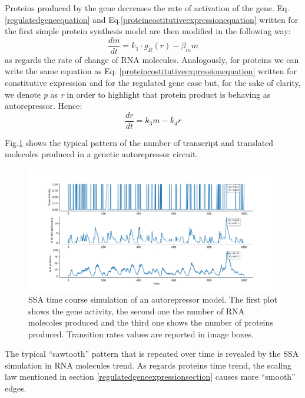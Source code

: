 \documentclass[12pt,a4paper]{report}
\begin{document}
Proteins produced by the gene decreases the rate of activation of the gene. Eq.\ref{regulatedgeneequation} and Eq.\ref{proteincostitutiveexpressionequation} written for the first simple protein synthesis model are then modified in the following way:
\begin{equation}
 \frac{dm}{dt} = k_{1} \cdot g_{R}(r) - \beta_{m}m
\end{equation}
as regards the rate of change of RNA molecules. Analogously, for proteins we can write the same equation as Eq. \ref{proteincostitutiveexpressionequation} written for constitutive expression and for the regulated gene case but, for the sake of clarity, we denote \emph{p} as \emph{r} in order to highlight that protein product is behaving as autorepressor. Hence:
\begin{equation}
 \frac{dr}{dt} = k_{3}m - k_{4}r
\end{equation}

Fig.\ref{autorepressortimeplot} shows the typical pattern of the number of transcript and translated molecoles produced in a genetic autorepressor circuit.

\begin{figure}[!ht]
\hspace*{-2.5cm} 
\includegraphics[scale=0.59]{autorepressortimeplot.png}
\caption{SSA time course simulation of an autorepressor model. The first plot shows the gene activity, the second one the number of RNA molecoles produced and the third one shows the number of proteins produced. Transition rates values are reported in image boxes.}
\label{autorepressortimeplot}
\end{figure}
\newpage
The typical ``sawtooth'' pattern that is repeated over time is revealed by the SSA simulation in RNA molecules trend. As regards proteins time trend, the scaling law mentioned in section \ref{regulatedgeneexpressionsection} causes more ``smooth'' edges. 
\end{document}
